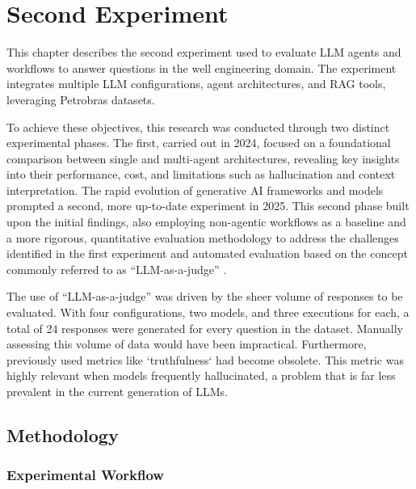 \chapter{Second Experiment}



    
    This chapter describes the second experiment used to evaluate LLM agents and workflows to answer questions in the well engineering domain. 
    The experiment integrates multiple LLM configurations, agent architectures, and RAG tools, leveraging Petrobras datasets.

    To achieve these objectives, this research was conducted through two distinct experimental phases. The first, carried out in 2024, focused on a foundational comparison between single and multi-agent architectures, revealing key insights into their performance, cost, and limitations such as hallucination and context interpretation. 
    The rapid evolution of generative AI frameworks and models prompted a second, more up-to-date experiment in 2025. 
    This second phase built upon the initial findings, also employing non-agentic workflows as a baseline and a more rigorous, quantitative evaluation methodology to address the challenges identified in the first experiment and automated evaluation based on the concept commonly referred to as ``LLM-as-a-judge'' \citep{Gu2025}.

    The use of \enquote{LLM-as-a-judge} was driven by the sheer volume of responses to be evaluated. 
    With four configurations, two models, and three executions for each, a total of 24 responses were generated for every question in the dataset.
    Manually assessing this volume of data would have been impractical.
    Furthermore, previously used metrics like `truthfulness` had become obsolete. 
    This metric was highly relevant when models frequently hallucinated, a problem that is far less prevalent in the current generation of LLMs. 

    \section{Methodology}

        \subsection{Experimental Workflow}

